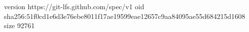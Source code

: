version https://git-lfs.github.com/spec/v1
oid sha256:51f0cd1e6d3e76ebe8011f17ae19599eae12657c9aa84095ae55d684215d1608
size 92761
